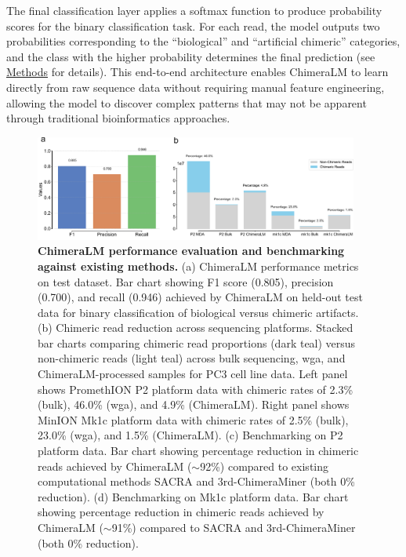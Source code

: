 \documentclass[pdflatex,sn-nature]{sn-jnl}%
\theoremstyle{thmstyleone}%
\theoremstyle{thmstyletwo}%
\theoremstyle{thmstylethree}%
\begin{document}
The final classification layer applies a softmax function to produce probability scores for the binary classification task.
For each read, the model outputs two probabilities corresponding to the ``biological'' and ``artificial chimeric'' categories, and the class with the higher probability determines the final prediction (see \hyperref[sec:methods]{Methods} for details).
This end-to-end architecture enables ChimeraLM to learn directly from raw sequence data without requiring manual feature engineering, allowing the model to discover complex patterns that may not be apparent through traditional bioinformatics approaches.

\begin{figure}[!ht]
	\begin{center}
		\includegraphics[width=0.95\textwidth]{final_figures/figure2}
	\end{center}
	\caption{{\bf ChimeraLM performance evaluation and benchmarking against existing methods.}
		(a) ChimeraLM performance metrics on test dataset. Bar chart showing F1 score (0.805), precision (0.700), and recall (0.946) achieved by ChimeraLM on held-out test data for binary classification of biological versus chimeric artifacts.
		(b) Chimeric read reduction across sequencing platforms. Stacked bar charts comparing chimeric read proportions (dark teal) versus non-chimeric reads (light teal) across bulk sequencing, \gls{wga}, and ChimeraLM-processed samples for PC3 cell line data. Left panel shows PromethION P2 platform data with chimeric rates of 2.3\% (bulk), 46.0\% (\gls{wga}), and 4.9\% (ChimeraLM). Right panel shows MinION Mk1c platform data with chimeric rates of 2.5\% (bulk), 23.0\% (\gls{wga}), and 1.5\% (ChimeraLM).
		(c) Benchmarking on P2 platform data. Bar chart showing percentage reduction in chimeric reads achieved by ChimeraLM ($\sim$92\%) compared to existing computational methods SACRA and 3rd-ChimeraMiner (both 0\% reduction).
		(d) Benchmarking on Mk1c platform data. Bar chart showing percentage reduction in chimeric reads achieved by ChimeraLM ($\sim$91\%) compared to SACRA and 3rd-ChimeraMiner (both 0\% reduction).}\label{fig:figure2}
\end{figure}
\end{document}
